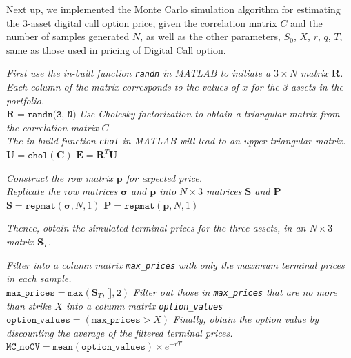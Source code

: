 Next up, we implemented the Monte Carlo simulation algorithm for estimating the 3-asset digital call option price, given the correlation matrix $C$ and the number of samples generated $N$, as well as the other parameters, $S_0$, $X$, $r$, $q$, $T$, same as those used in pricing of Digital Call option.

\begin{algorithm}[H]
	\textit{First use the in-built function \emph{\texttt{randn}} in MATLAB to initiate a $3 \times N$ matrix \emph{$\mathbf{R}$.}} \\
	\textit{Each column of the matrix corresponds to the values of $x$ for the 3 assets in the portfolio.} \\
	$\mathbf{R} = \texttt{randn(3, N)}$\;
	\textit{Use Cholesky factorization to obtain a triangular matrix from the correlation matrix $C$} \\
	\textit{The in-build function \emph{\texttt{chol}} in MATLAB will lead to an upper triangular matrix.} \\
	$\mathbf{U} = \texttt{chol}(\mathbf{C})$ \;
	$\mathbf{E} =\mathbf{R}^T \mathbf{U} $ \;
	
	\textit{Construct the row matrix $\mathbf{p}$ for expected price.} \\
	\textit{Replicate the row matrices $\pmb{\sigma}$ and $\mathbf{p}$ into $N \times 3$ matrices $\mathbf{S}$ and $\mathbf{P}$} \\
	$\mathbf{S} = \texttt{repmat}(\pmb{\sigma}, N, 1)$ \;
	$\mathbf{P} = \texttt{repmat}(\mathbf{p}, N, 1)$ \;
	
	\textit{Thence, obtain the simulated terminal prices for the three assets, in an $N \times 3$ matrix $\mathbf{S}_T$.} \\
	
	\textit{Filter into a column matrix \emph{\texttt{max\_prices}} with only the maximum terminal prices in each sample.} \\
	$\texttt{max\_prices} = \texttt{max}(\mathbf{S}_T, \texttt{[]}, \texttt{2})$\;
	\textit{Filter out those in \emph{\texttt{max\_prices}} that are no more than strike $X$ into a column matrix \emph{\texttt{option\_values}}} \\
	$\texttt{option\_values} = (\texttt{max\_prices} > X)$ \;
	\textit{Finally, obtain the option value by discounting the average of the filtered terminal prices.} \\
	$\texttt{MC\_noCV} = \texttt{mean}(\texttt{option\_values}) \times e^{-rT}$ \;
	
\end{algorithm}

